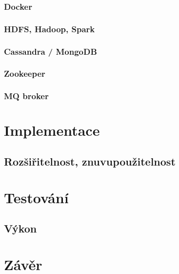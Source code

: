 \subsection{Docker}
\subsection{HDFS, Hadoop, Spark}
\subsection{Cassandra / MongoDB}
\subsection{Zookeeper}
\subsection{MQ broker}

\chapter{Implementace}
\section{Rozšiřitelnost, znuvupoužitelnost}

\chapter{Testování}
\section{Výkon}

\chapter{Závěr}

